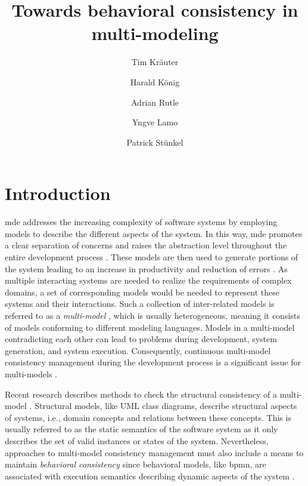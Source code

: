 \documentclass{jot}
\title{Towards behavioral consistency in multi-modeling}
\author[$\ast$]{Tim Kräuter}
\author[$\ast\dagger$]{Harald König}
\author[$\ast$]{Adrian Rutle}
\author[$\ast$]{Yngve Lamo}
\author[$\ddagger$]{Patrick Stünkel}
\affil[$\ast$]{Western Norway University of Applied Sciences, Bergen, Norway}
\affil[$\dagger$]{University of Applied Sciences, FHDW, Hannover, Germany}
\affil[$\ddagger$]{Haukeland Universitetssykehus, Bergen, Norway}
\begin{document}
    
\maketitle
{}

\section{Introduction}
\gls*{mde} addresses the increasing complexity of software systems by employing models to describe the different aspects of the system.
In this way, \gls*{mde} promotes a clear separation of concerns and raises the abstraction level throughout the entire development process \cite{franceModeldrivenDevelopmentComplex2007}.
These models are then used to generate portions of the system leading to an increase in productivity and reduction of errors \cite{brambillaModeldrivenSoftwareEngineering2017}.
As multiple interacting systems are needed to realize the requirements of complex domains, a set of corresponding models would be needed to represent these systems and their interactions.
Such a collection of inter-related models is referred to as a \emph{multi-model} \cite{boronatWhatMultimodelingLanguage2009, stunkelComprehensiveSystemsFormal2021}, which is usually heterogeneous, meaning it consists of models conforming to different modeling languages.
Models in a multi-model contradicting each other can lead to problems during development, system generation, and system execution.
Consequently, continuous multi-model consistency management during the development process is a significant issue for multi-models \cite{spanoudakisInconsistencyManagementSoftware2001, cicchettiMultiviewApproachesSoftware2019}.

Recent research describes methods to check the structural consistency of a multi-model \cite{stunkelComprehensiveSystemsFormal2021, klareCommonalitiesPreservingConsistency2019}.
Structural models, like UML class diagrams, describe structural aspects of systems, i.e., domain concepts and relations between these concepts.
This is usually referred to as the static semantics of the software system as it only describes the set of valid instances or states of the system.
Nevertheless, approaches to multi-model consistency management must also include a means to maintain \emph{behavioral consistency} since behavioral models, like \gls*{bpmn}, are associated with execution semantics describing dynamic aspects of the system \cite{objectmanagementgroupUnifiedModelingLanguage2017, objectmanagementgroupBusinessProcessModel2013}.
\end{document}
